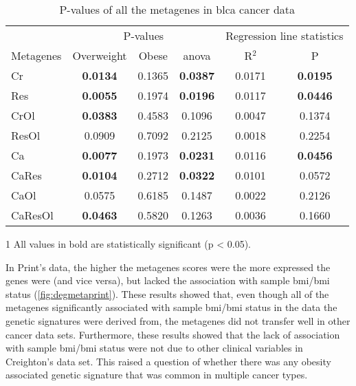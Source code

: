 \begin{table}[htpb]
	\centering
	\caption{P-values of all the metagenes in \gls{blca} cancer data}
	\label{tab:degmetablca}
	\begin{threeparttable}
		\begin{tabular}{lccccc}
			& \multicolumn{3}{c}{ P-values} & \multicolumn{2}{c}{ Regression line statistics}\\
			\cmidrule(r){2-4} \cmidrule(r){5-6}
			 Metagenes &  Overweight &  Obese &  \gls{anova} &  R$^2$ &  P \\
			\hline
			\rule{0pt}{2.25ex}Cr & {\bfseries 0.0134}\tnote{1} & 0.1365 & {\bfseries 0.0387} & 0.0171 & {\bfseries 0.0195} \\
			Res                  & {\bfseries 0.0055}          & 0.1974 & {\bfseries 0.0196} & 0.0117 & {\bfseries 0.0446} \\
			CrOl                 & {\bfseries 0.0383}          & 0.4583 & 0.1096             & 0.0047 & 0.1374             \\
			ResOl                & 0.0909                      & 0.7092 & 0.2125             & 0.0018 & 0.2254             \\
			Ca                   & {\bfseries 0.0077}          & 0.1973 & {\bfseries 0.0231} & 0.0116 & {\bfseries 0.0456} \\
			CaRes                & {\bfseries 0.0104}          & 0.2712 & {\bfseries 0.0322} & 0.0101 & 0.0572             \\
			CaOl                 & 0.0575                      & 0.6185 & 0.1487             & 0.0022 & 0.2126             \\
			CaResOl              & {\bfseries 0.0463}          & 0.5820 & 0.1263             & 0.0036 & 0.1660             \\
			\hline
			\hline
		\end{tabular}
		\begin{tablenotes}
			\item [1] All values in bold are statistically significant (p \textless{} 0.05).
		\end{tablenotes}
	\end{threeparttable}
\end{table}

In Print's data, the higher the metagenes scores were the more expressed the genes were (and vice versa), but lacked the association with sample \gls{bmi}/\gls{bmi} status (\cref{fig:degmetaprint}).
These results showed that, even though all of the metagenes significantly associated with sample \gls{bmi}/\gls{bmi} status in the data the genetic signatures were derived from, the metagenes did not transfer well in other cancer data sets.
Furthermore, these results showed that the lack of association with sample \gls{bmi}/\gls{bmi} status were not due to other clinical variables in Creighton's data set.
This raised a question of whether there was any obesity associated genetic signature that was common in multiple cancer types.

